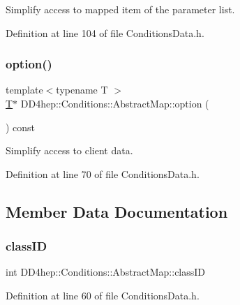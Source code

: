 Simplify access to mapped item of the parameter list. 



Definition at line 104 of file Conditions\+Data.\+h.

\hypertarget{class_d_d4hep_1_1_conditions_1_1_abstract_map_a3fcf32e790b916135380a6f77ab06cf0}{}\label{class_d_d4hep_1_1_conditions_1_1_abstract_map_a3fcf32e790b916135380a6f77ab06cf0} 
\subsubsection{\texorpdfstring{option()}{option()}}
{\footnotesize\ttfamily template$<$typename T $>$ \\
\hyperlink{class_t}{T}$\ast$ D\+D4hep\+::\+Conditions\+::\+Abstract\+Map\+::option (\begin{DoxyParamCaption}{ }\end{DoxyParamCaption}) const\hspace{0.3cm}{\ttfamily [inline]}}



Simplify access to client data. 



Definition at line 70 of file Conditions\+Data.\+h.



\subsection{Member Data Documentation}
\hypertarget{class_d_d4hep_1_1_conditions_1_1_abstract_map_a33a343986fada98f91b7118368fa7248}{}\label{class_d_d4hep_1_1_conditions_1_1_abstract_map_a33a343986fada98f91b7118368fa7248} 
\subsubsection{\texorpdfstring{class\+ID}{classID}}
{\footnotesize\ttfamily int D\+D4hep\+::\+Conditions\+::\+Abstract\+Map\+::class\+ID}



Definition at line 60 of file Conditions\+Data.\+h.



